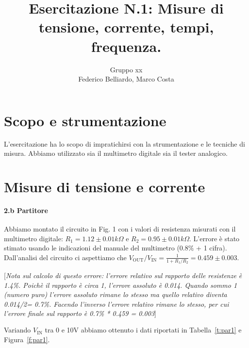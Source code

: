 \documentclass[10pt,a4paper]{article}
\author{Gruppo xx \\ Federico Belliardo, Marco Costa}
\title{Esercitazione N.1: Misure di tensione, corrente, tempi, frequenza.}
\newcommand{\rem}[1]{[\emph{#1}]}
\begin{document}
\maketitle

\section{Scopo e strumentazione}

L'esercitazione ha lo scopo di impratichirsi con la strumentazione e le tecniche di misura. 
Abbiamo utilizzato sia il multimetro digitale sia il tester analogico. 

\section{Misure di tensione e corrente}
\paragraph{2.b Partitore}
Abbiamo montato il circuito in Fig. 1 con i valori di resistenza misurati con il multimetro digitale: $R_1 = 1.12\pm 0.01 k\Omega$ e $R_2 = 0.95\pm 0.01 k\Omega$. L'errore \`e stato stimato usando le indicazioni del manuale del multimetro ($0.8\%$ + 1 cifra). 
Dall'analisi del circuito ci aspettiamo che $V_\mathrm{OUT}/V_\mathrm{IN} = \frac{1}{1+R_1/R_2}= 0.459 \pm 0.003 $.

\rem{Nota sul calcolo di questo errore: l'errore relativo sul rapporto delle resistenze \`e 1.4\%. Poich\`e il rapporto \`e circa 1, l'errore assoluto \`e 0.014. Quando sommo 1 (numero puro) l'errore assoluto rimane lo stesso ma quello relativo diventa 0.014/2= 0.7\%. Facendo l'inverso l'errore relativo rimane lo stesso, per cui l'errore finale sul rapporto \`e 0.7\% * 0.459 = 0.003}

Variando $V_\mathrm{IN}$ tra 0 e 10V abbiamo ottenuto i dati riportati in Tabella~\ref{t:par1} e Figura~\ref{f:par1}.
\end{document}
